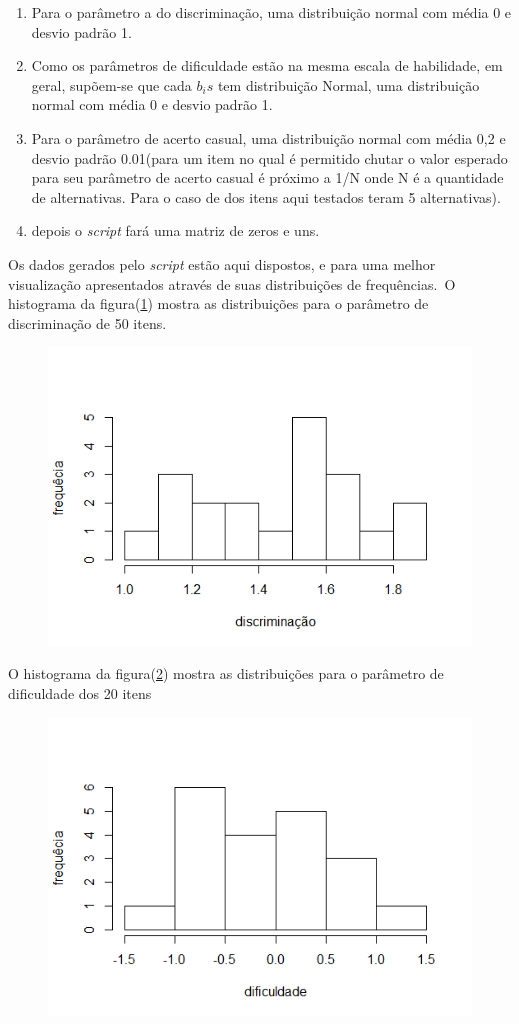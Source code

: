 	    \begin{enumerate}
	        \item  Para o parâmetro a do discriminação, uma distribuição normal com média 0 e desvio padrão 1.
	        \item 	Como os parâmetros de dificuldade estão na mesma escala de habilidade, em geral, supõem-se que cada $b_is$ tem distribuição Normal,  uma distribuição normal com média 0 e desvio padrão 1.
	        \item 	Para o parâmetro de acerto casual, uma distribuição normal com média 0,2 e desvio padrão 0.01(para um item no qual é permitido chutar o valor esperado para seu parâmetro de acerto casual é próximo a 1/N onde N é a quantidade de alternativas. Para o caso de dos itens aqui testados teram 5 alternativas).
	        \item depois o \textit{script} fará uma matriz de zeros e uns.\\
	    \end{enumerate}
    Os dados gerados pelo \textit{script} estão aqui dispostos, e para uma melhor visualização apresentados através de suas distribuições de frequências.\
	O histograma da figura(\ref{fig:a}) mostra as distribuições para o parâmetro de discriminação de 50 itens.\\
	\begin{figure}[!h]
		\centering
		\includegraphics[width=0.6\linewidth]{img/a}
		\caption{}
		\label{fig:a}
	\end{figure}
	
	\newpage
	
	O histograma da figura(\ref{fig:b}) mostra as distribuições para o parâmetro de dificuldade dos 20 itens
	
	\begin{figure}[!h]
		\centering
		\includegraphics[width=0.6\linewidth]{img/b}
		\caption{}
		\label{fig:b}
	\end{figure}
	

